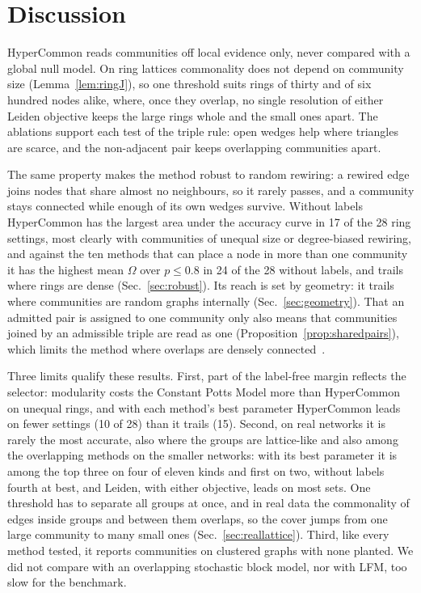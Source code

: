 \section{Discussion}
\label{sec:discussion}

HyperCommon reads communities off local evidence only, never compared with a global null model. On ring lattices commonality does not depend on
community size (Lemma~\ref{lem:ringJ}), so one threshold suits rings of thirty and of six
hundred nodes alike, where, once they overlap, no single resolution of either Leiden objective keeps the large rings whole and the small ones apart. The ablations support each test of the triple rule: open wedges help where triangles are scarce, and the non-adjacent pair keeps overlapping communities apart.

The same property makes the method robust to random rewiring: a rewired edge joins nodes that share almost no neighbours, so it rarely passes, and a community stays connected while enough of its own wedges survive. Without labels
HyperCommon has the largest area under the accuracy curve in 17 of the 28 ring settings, most clearly with communities of unequal size or degree-biased rewiring, and against the ten methods that can place a node in more than one community it has the highest mean $\Omega$ over $p\le0.8$ in 24 of the 28 without labels, and trails where rings are
dense (Sec.~\ref{sec:robust}). Its reach is set by geometry: it trails where communities are random graphs internally (Sec.~\ref{sec:geometry}). That an admitted pair is assigned to one community only also means that
communities joined by an admissible triple are read as one
(Proposition~\ref{prop:sharedpairs}), which limits the method where overlaps are
densely connected~\cite{yang2014structure,yang2012community}.

Three limits qualify these results. First, part of the label-free margin reflects the
selector: modularity costs the Constant Potts Model more than HyperCommon on unequal
rings, and with each method's best parameter HyperCommon leads on fewer settings (10 of
28) than it trails (15). Second, on real networks it is rarely the most accurate, also where the groups are lattice-like and also among the overlapping methods on the smaller networks: with its best parameter it is among the top three on four of eleven kinds and first on two, without labels fourth at best, and Leiden, with either objective, leads on most sets. One threshold
has to separate all groups at once, and in real data the commonality of edges inside
groups and between them overlaps, so the cover jumps from one large community to many
small ones (Sec.~\ref{sec:reallattice}). Third, like every method tested, it reports communities on clustered graphs with none planted. We did not compare with an overlapping stochastic block model, nor with LFM, too slow for the benchmark.

